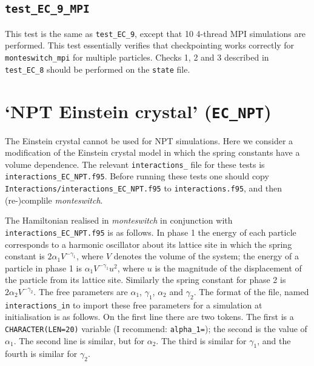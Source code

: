\documentclass{report}
\begin{document}
\subsection{\texttt{test\_EC\_9\_MPI}}
This test is the same as \texttt{test\_EC\_9}, except that 10 4-thread MPI simulations are performed. This test essentially verifies 
that checkpointing works correctly for \texttt{monteswitch\_mpi} for multiple particles. Checks 1, 2 and 3 described in \texttt{test\_EC\_8} should be 
performed on the \texttt{state} file.




\section{`NPT Einstein crystal' (\texttt{EC\_NPT})}
The Einstein crystal cannot be used for NPT simulations. Here we consider a modification of the Einstein
crystal model in which the spring constants have a volume dependence. The relevant \texttt{interactions\_} file for these tests is 
\texttt{interactions\_EC\_NPT.f95}. Before running these tests one should copy 
\texttt{Interactions/interactions\_EC\_NPT.f95} to \texttt{interactions.f95}, and then (re-)complile 
\emph{monteswitch}.

The Hamiltonian realised in \emph{monteswitch} in conjunction with \texttt{interactions\_EC\_NPT.f95} is 
as follows. In phase 1 the energy of each particle corresponds to a harmonic oscillator about its
lattice site in which the spring constant is $2\alpha_1V^{-\gamma_1}$, where $V$ denotes the volume of 
the system; the energy of a particle in phase 1 is $\alpha_1V^{-\gamma_1}u^2$, where $u$ is the magnitude of the displacement
of the particle from its lattice site. Similarly the spring constant for phase 2 is $2\alpha_2V^{-\gamma_2}$.
The free parameters are $\alpha_1$, $\gamma_1$, $\alpha_2$ and $\gamma_2$.
The format of the file, named \texttt{interactions\_in} to import these free parameters for a simulation at initialisation
is as follows. On the first line there are two tokens. The first is a \texttt{CHARACTER(LEN=20)} variable (I recommend: \texttt{alpha\_1=});
the second is the value of $\alpha_1$. The second line is similar, but for $\alpha_2$. The third is similar for $\gamma_1$, 
and the fourth is similar for $\gamma_2$.
\end{document}
